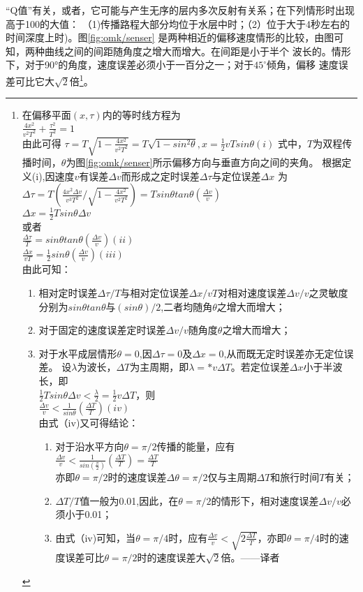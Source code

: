 “Q值”有关，或者，它可能与产生无序的层内多次反射有关系；在下列情形时出现高于100的大值：
（1)传播路程大部分均位于水层中时；（2）位于大于4秒左右的时间深度上时)。图\ref{fig:omk/senser}
是两种相近的偏移速度情形的比较，由图可知，两种曲线之间的间距随角度之增大而增大。在间距是小于半个
波长的。情形下，对于90°的角度，速度误差必须小于一百分之一；对于$45^{\circ}$倾角，偏移
速度误差可比它大$\sqrt{2}$倍\footnote{在偏移平面$(x,\tau)$内的等时线方程为\\
$\frac{4x^2}{v^2T^2}+\frac{\tau^2}{T^2}=1$\\
由此可得
$\tau=T\sqrt{1-\frac{4x^2}{v^2T^2}}=T\sqrt{1-sin^2\theta},x=\frac{1}{2}vTsin\theta (i)$
式中，$T$为双程传播时间，$\theta$为图\ref{fig:omk/senser}所示偏移方向与垂直方向之间的夹角。
根据定义(i),因速度$v$有误差$\Delta v$而形成之定时误差$\Delta \tau$与定位误差$\Delta x$
为\\
$\Delta \tau=T(\frac{4x^2\Delta v}{v^3T^2}/\sqrt{1-\frac{4x^2}{v^2T^2}})=T
sin\theta tan\theta(\frac{\Delta v}{v})$\\
$\Delta x = \frac{1}{2}Tsin\theta\Delta v$\\
或者\\
$\frac{\Delta\tau}{T}=sin\theta tan\theta(\frac{\Delta v}{v}) (ii)$\\
$\frac{\Delta x}{vT}=\frac{1}{2}sin\theta(\frac{\Delta v}{v}) (iii)$\\
由此可知：
\begin{enumerate}
\item 相对定时误差$\Delta \tau/T$与相对定位误差$\Delta x/vT$对相对速度误差$\Delta v/v$之灵敏度分别为$sin\theta tan\theta$与$(sin\theta)/2$,二者均随角$\theta$之增大而增大；
\item 对于固定的速度误差定时误差$\Delta v/v$随角度$\theta$之增大而增大；
\item 对于水平成层情形$\theta=0$,因$\Delta\tau=0$及$\Delta x=0$,从而既无定时误差亦无定位误差。
设$\lambda$为波长，$\Delta T$为主周期，即$\lambda=*v\Delta T$。若定位误差$\Delta x$小于半波长，即\\
$\frac{1}{2}Tsin\theta\Delta v<\frac{\lambda}{2}=\frac{1}{2}v\Delta T$，则\\
$\frac{\Delta v}{v}<\frac{1}{sin\theta}(\frac{\Delta T}{T} ) (iv)$\\
由式（iv)又可得结论：
\begin{enumerate}
\item 对于沿水平方向$\theta=\pi/2$传播的能量，应有\\
$\frac{\Delta v}{v}<\frac{1}{sin(\frac{\pi}{2})}(\frac{\Delta T}{T})=\frac{\Delta T}{T}$\\
亦即$\theta=\pi/2$时的速度误差$\Delta \theta=\pi/2$仅与主周期$\Delta T$和旅行时间$T$有关；
\item   $\Delta T/T$值一般为0.01,因此，在$\theta=\pi/2$的情形下，相对速度误差$\Delta v/v$必须小于0.01；
\item   由式（iv)可知，当$\theta=\pi/4$时，应有$\frac{\Delta v}{v}<\sqrt{2\frac{\Delta T}{T}}$，亦即$\theta=\pi/4$时的速度误差可比$\theta=\pi/2$时的速度误差大$\sqrt{2}$倍。——译者
\end{enumerate}
\end{enumerate}
}。

